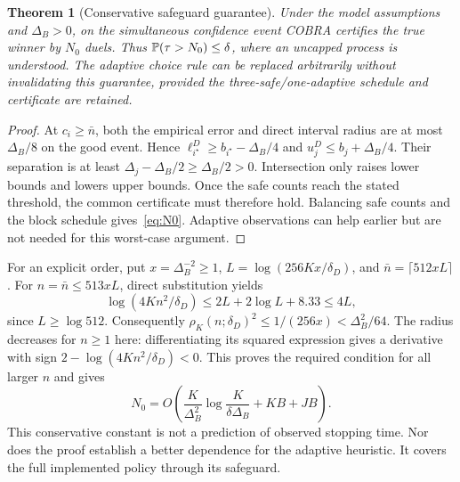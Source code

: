 \documentclass[11pt,a4paper]{article}
\newtheorem{theorem}{Theorem}\newtheorem{lemma}{Lemma}
\begin{document}
\begin{theorem}[Conservative safeguard guarantee]\label{thm:sample}
Under the model assumptions and $\Delta_B>0$, on the simultaneous confidence event COBRA certifies the true winner by $N_0$ duels. Thus $\mathbb P(\tau>N_0)\le\delta$, where an uncapped process is understood. The adaptive choice rule can be replaced arbitrarily without invalidating this guarantee, provided the three-safe/one-adaptive schedule and certificate are retained.
\end{theorem}
\begin{proof}
At $c_i\ge\bar n$, both the empirical error and direct interval radius are at most $\Delta_B/8$ on the good event. Hence $\ell_{i^\star}^D\ge b_{i^\star}-\Delta_B/4$ and $u_j^D\le b_j+\Delta_B/4$. Their separation is at least $\Delta_j-\Delta_B/2\ge\Delta_B/2>0$. Intersection only raises lower bounds and lowers upper bounds. Once the safe counts reach the stated threshold, the common certificate must therefore hold. Balancing safe counts and the block schedule gives~\eqref{eq:N0}. Adaptive observations can help earlier but are not needed for this worst-case argument.
\end{proof}
For an explicit order, put $x=\Delta_B^{-2}\ge1$, $L=\log(256Kx/\delta_D)$, and $\bar n=\lceil512xL\rceil$. For $n=\bar n\le513xL$, direct substitution yields
\[
\log(4Kn^2/\delta_D)\le2L+2\log L+8.33\le4L,
\]
since $L\ge\log512$. Consequently $\rho_K(n;\delta_D)^2\le1/(256x)<\Delta_B^2/64$. The radius decreases for $n\ge1$ here: differentiating its squared expression gives a derivative with sign $2-\log(4Kn^2/\delta_D)<0$. This proves the required condition for all larger $n$ and gives
\begin{equation}\label{eq:sampleorder}
N_0=O\!\left(\frac K{\Delta_B^2}\log\frac K{\delta\Delta_B}+KB+JB\right).
\end{equation}
This conservative constant is not a prediction of observed stopping time. Nor does the proof establish a better dependence for the adaptive heuristic. It covers the full implemented policy through its safeguard.
\end{document}
